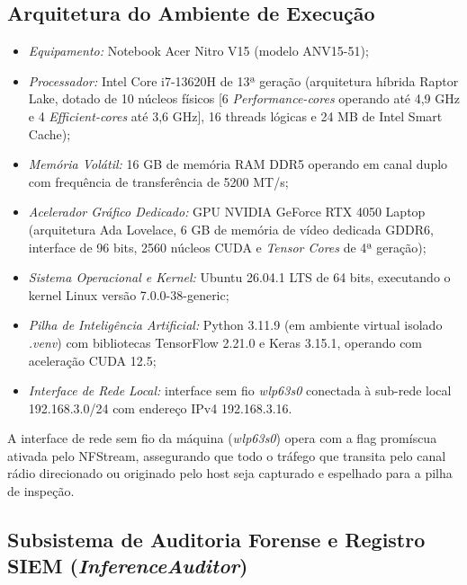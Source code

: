 \subsection{Arquitetura do Ambiente de Execução}
\label{subsec:arquitetura_execucao}

\begin{itemize}
    \item \emph{Equipamento:} Notebook Acer Nitro V15 (modelo ANV15-51);
    \item \emph{Processador:} Intel Core i7-13620H de 13ª geração (arquitetura híbrida Raptor Lake, dotado de 10
    núcleos físicos [6 \emph{Performance-cores} operando até 4,9 GHz e 4 \emph{Efficient-cores} até 3,6 GHz], 16
    threads lógicas e 24 MB de Intel Smart Cache);
    \item \emph{Memória Volátil:} 16 GB de memória RAM DDR5 operando em canal duplo com frequência de transferência
    de 5200 MT/s;
    \item \emph{Acelerador Gráfico Dedicado:} GPU NVIDIA GeForce RTX 4050 Laptop (arquitetura Ada Lovelace, 6 GB de
    memória de vídeo dedicada GDDR6, interface de 96 bits, 2560 núcleos CUDA e \emph{Tensor Cores} de 4ª geração);
    \item \emph{Sistema Operacional e Kernel:} Ubuntu 26.04.1 LTS de 64 bits, executando o kernel Linux versão
    7.0.0-38-generic;
    \item \emph{Pilha de Inteligência Artificial:} Python 3.11.9 (em ambiente virtual isolado \emph{.venv}) com
    bibliotecas TensorFlow 2.21.0 e Keras 3.15.1, operando com aceleração CUDA 12.5;
    \item \emph{Interface de Rede Local:} interface sem fio \emph{wlp63s0} conectada à sub-rede local 192.168.3.0/24
    com endereço IPv4 192.168.3.16.
\end{itemize}

A interface de rede sem fio da máquina (\emph{wlp63s0}) opera com a flag promíscua ativada pelo NFStream, assegurando
que todo o tráfego que transita pelo canal rádio direcionado ou originado pelo host seja capturado e espelhado para a
pilha de inspeção.

\subsection{Subsistema de Auditoria Forense e Registro SIEM (\emph{InferenceAuditor})}

